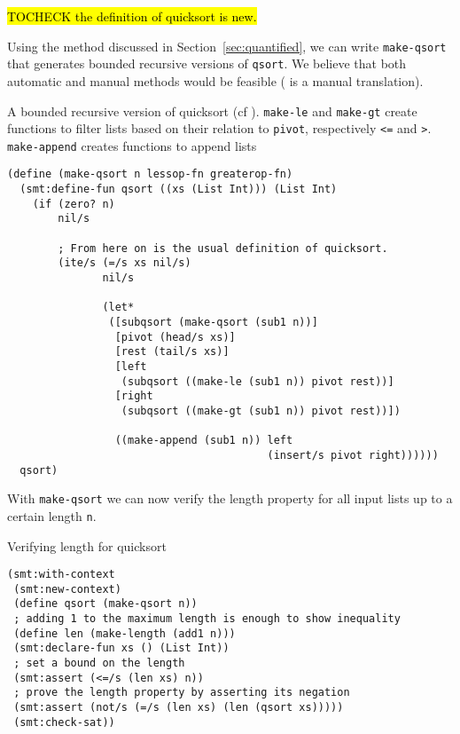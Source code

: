 \hl{TOCHECK the definition of quicksort is new.}

Using the method discussed in Section~\ref{sec:quantified}, we can write
\texttt{make-qsort} that generates bounded recursive versions of
\texttt{qsort}. We believe that both automatic and manual methods would be
feasible ( is a manual translation).

\begin{program}

\caption[A bounded recursive version of quicksort]{A bounded recursive version
of quicksort (cf ). \texttt{make-le} and \texttt{make-gt}
create functions to filter lists based on their relation to \texttt{pivot},
respectively \texttt{<=} and \texttt{>}. \texttt{make-append} creates
functions to append lists}

\label{fig:qsort-smt}
\begin{verbatim}
(define (make-qsort n lessop-fn greaterop-fn)
  (smt:define-fun qsort ((xs (List Int))) (List Int)
    (if (zero? n)
        nil/s

        ; From here on is the usual definition of quicksort.
        (ite/s (=/s xs nil/s)
               nil/s

               (let*
                ([subqsort (make-qsort (sub1 n))]
                 [pivot (head/s xs)]
                 [rest (tail/s xs)]
                 [left
                  (subqsort ((make-le (sub1 n)) pivot rest))]
                 [right
                  (subqsort ((make-gt (sub1 n)) pivot rest))])

                 ((make-append (sub1 n)) left
                                         (insert/s pivot right))))))
  qsort)
\end{verbatim}
\end{program}

With \texttt{make-qsort} we can now verify the length property for all input
lists up to a certain length \texttt{n}.

\begin{program}
\caption{Verifying length for quicksort}
\begin{verbatim}
(smt:with-context
 (smt:new-context)
 (define qsort (make-qsort n))
 ; adding 1 to the maximum length is enough to show inequality
 (define len (make-length (add1 n)))
 (smt:declare-fun xs () (List Int))
 ; set a bound on the length
 (smt:assert (<=/s (len xs) n))
 ; prove the length property by asserting its negation
 (smt:assert (not/s (=/s (len xs) (len (qsort xs)))))
 (smt:check-sat))
\end{verbatim}
\end{program}


